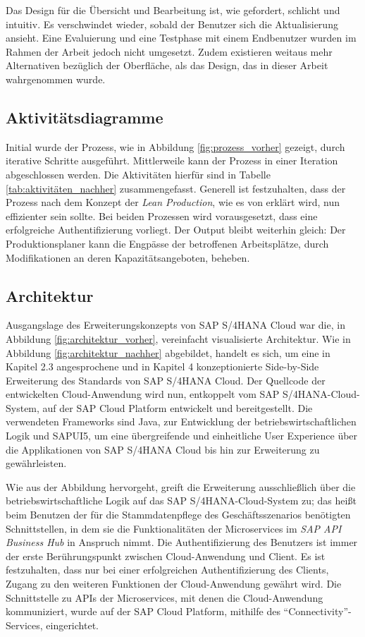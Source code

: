 Das Design für die Übersicht und Bearbeitung ist, wie gefordert, schlicht und intuitiv. Es verschwindet wieder, sobald der Benutzer sich die Aktualisierung ansieht. Eine  Evaluierung und eine Testphase mit einem Endbenutzer wurden im Rahmen der Arbeit jedoch nicht umgesetzt. Zudem existieren weitaus mehr Alternativen bezüglich der Oberfläche, als das Design, das in dieser Arbeit wahrgenommen wurde. 

\subsection{Aktivitätsdiagramme}
Initial wurde der Prozess, wie in Abbildung \ref{fig:prozess_vorher} gezeigt, durch iterative Schritte ausgeführt. Mittlerweile kann der Prozess in einer Iteration abgeschlossen werden. Die Aktivitäten hierfür sind in Tabelle \ref{tab:aktivitäten_nachher} zusammengefasst. 
Generell ist festzuhalten, dass der Prozess nach dem Konzept der \textit{Lean Production}, wie es von \citeauthor{Syska.2006} erklärt wird, nun effizienter sein sollte.
\autocite{Syska.2006}
Bei beiden Prozessen wird vorausgesetzt, dass eine erfolgreiche Authentifizierung vorliegt. Der Output bleibt weiterhin gleich: Der Produktionsplaner kann die Engpässe der betroffenen Arbeitsplätze, durch Modifikationen an deren Kapazitätsangeboten, beheben.

\subsection{Architektur}
Ausgangslage des Erweiterungskonzepts von SAP S/4HANA Cloud war die, in Abbildung \ref{fig:architektur_vorher}, vereinfacht visualisierte Architektur. Wie in Abbildung  \ref{fig:architektur_nachher} abgebildet, handelt es sich, um eine in Kapitel 2.3 angesprochene und in Kapitel 4 konzeptionierte Side-by-Side Erweiterung des Standards von SAP S/4HANA Cloud. Der Quellcode der entwickelten Cloud-Anwendung wird nun, entkoppelt vom SAP S/4HANA-Cloud-System, auf der SAP Cloud Platform entwickelt und bereitgestellt. Die verwendeten Frameworks sind Java, zur Entwicklung der betriebswirtschaftlichen Logik und SAPUI5, um eine übergreifende und einheitliche User Experience über die Applikationen von SAP S/4HANA Cloud bis hin zur Erweiterung zu gewährleisten.

Wie aus der Abbildung hervorgeht, greift die Erweiterung ausschließlich über die betriebswirtschaftliche Logik auf das SAP S/4HANA-Cloud-System zu; das heißt beim Benutzen der für die Stammdatenpflege des Geschäftsszenarios benötigten Schnittstellen, in dem sie die Funktionalitäten der Microservices im \textit{SAP API Business Hub} in Anspruch nimmt. Die Authentifizierung des Benutzers ist immer der erste Berührungspunkt zwischen Cloud-Anwendung und Client. Es ist festzuhalten, dass nur bei einer erfolgreichen Authentifizierung des Clients, Zugang zu den weiteren Funktionen der Cloud-Anwendung gewährt wird. Die Schnittstelle zu \ac{API}s der Microservices, mit denen die Cloud-Anwendung kommuniziert, wurde auf der SAP Cloud Platform, mithilfe des \enquote{Connectivity}-Services, eingerichtet.
% 
% 
% 
% 
% 
% 
